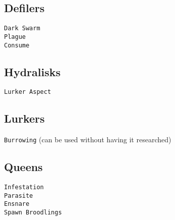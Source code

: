 \subsection{Defilers}
\verb|Dark Swarm| \\
\verb|Plague| \\
\verb|Consume| 

\subsection{Hydralisks}
\verb|Lurker Aspect|

\subsection{Lurkers}
\verb|Burrowing| (can be used without having it researched)

\subsection{Queens}
\verb|Infestation| \\
\verb|Parasite| \\
\verb|Ensnare| \\
\verb|Spawn Broodlings|